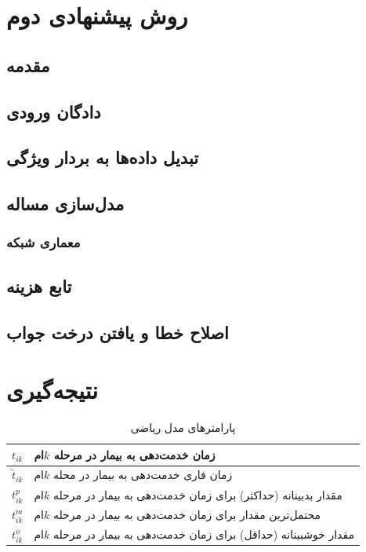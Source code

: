 \section{روش پیشنهادی دوم}

\subsection{مقدمه}

\subsection{دادگان ورودی}

\subsection{تبدیل داده‌ها به بردار ویژگی}

\subsection{مدل‌سازی مساله}

\subsubsection{معماری شبکه}

\subsection{تابع هزینه}

\subsection{اصلاح خطا و یافتن درخت جواب}

\section{نتیجه‌گیری}




	\begin{table}[ht]
	\caption{پارامترهای مدل ریاضی}
	\label{tab:modelParameters}
	\centering
	\onehalfspacing
	\begin{tabularx}{0.9\textwidth}{|r|X|}
		\hline
		$t_{ik}$			& زمان خدمت‌دهی به بیمار در مرحله $k$ام \\
		\hline
		$\tilde{t}_{ik}$	& زمان فاری خدمت‌دهی به بیمار در محله $k$ام \\
		\hline
		$t_{ik}^p$			& مقدار بدبینانه (حداکثر) برای زمان خدمت‌دهی به بیمار در مرحله $k$ام \\
		\hline
		$t_{ik}^m$			& محتمل‌ترین مقدار برای زمان خدمت‌دهی به بیمار در مرحله $k$ام \\
		\hline
		$t_{ik}^o$			& مقدار خوشبینانه (حداقل) برای زمان خدمت‌دهی به بیمار در مرحله $k$ام \\
		\hline
	\end{tabularx}
\end{table}


